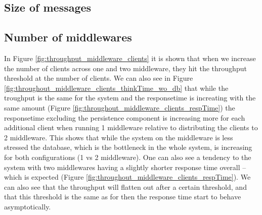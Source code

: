 \documentclass{article}
\begin{document}
\begin{table}
\begin{tabular}

        \subsection{Size of messages}

        \subsection{Number of middlewares}
		   In Figure \ref{fig:throughput_middleware_clients} it is shown that when we increase the number of clients across one and two middleware, they hit the throughput threshold at the number of clients. We can also see in Figure \ref{fig:throughout_middleware_clients_thinkTime_wo_db} that while the troughput is the same for the system and the responsetime is increating with the same amount (Figure \ref{fig:throughout_middleware_clients_respTime}) the responsetime excluding the persistence component is increasing more for each additional client when running 1 middleware relative to distributing the clients to 2 middleware. This shows that while the system on the middleware is less stressed the database, which is the bottleneck in the whole system, is increasing for both configurations (1 vs 2 middleware). One can also see a tendency to the system with two middlewares having a slightly shorter response time overall -- which is expected (Figure \ref{fig:throughout_middleware_clients_respTime}). We can also see that the throughput will flatten out after a certain threshold, and that this threshold is the same as for then the response time start to behave asymptotically.


\end{tabular}
\end{table}
\end{document}
